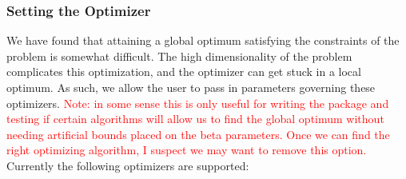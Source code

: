 \documentclass[12pt]{article}
\begin{document}
\subsubsection{Setting the Optimizer}\label{optimizer}

We have found that attaining a global optimum satisfying the constraints of the problem is somewhat difficult. The high dimensionality of the problem complicates this optimization, and the optimizer can get stuck in a local optimum. As such, we allow the user to pass in parameters governing these optimizers. \textcolor{red}{Note: in some sense this is only useful for writing the package and testing if certain algorithms will allow us to find the global optimum without needing artificial bounds placed on the beta parameters. Once we can find the right optimizing algorithm, I suspect we may want to remove this option.} Currently the following optimizers are supported:
\end{document}
